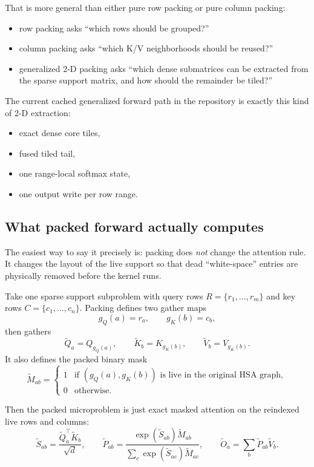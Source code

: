 \documentclass[11pt]{article}
\begin{document}
That is more general than either pure row packing or pure column packing:
\begin{itemize}[leftmargin=1.5em]
    \item row packing asks ``which rows should be grouped?''
    \item column packing asks ``which K/V neighborhoods should be reused?''
    \item generalized 2-D packing asks ``which dense submatrices can be
    extracted from the sparse support matrix, and how should the remainder be
    tiled?''
\end{itemize}

The current cached generalized forward path in the repository is exactly this
kind of 2-D extraction:
\begin{itemize}[leftmargin=1.5em]
    \item exact dense core tiles,
    \item fused tiled tail,
    \item one range-local softmax state,
    \item one output write per row range.
\end{itemize}

\subsection{What packed forward actually computes}

The easiest way to say it precisely is: packing does \emph{not} change the
attention rule. It changes the layout of the live support so that dead
``white-space'' entries are physically removed before the kernel runs.

Take one sparse support subproblem with query rows $R=\{r_1,\dots,r_m\}$ and
key rows $C=\{c_1,\dots,c_n\}$. Packing defines two gather maps
\[
g_Q(a)=r_a,\qquad g_K(b)=c_b,
\]
then gathers
\[
\widetilde Q_a = Q_{g_Q(a)},\qquad
\widetilde K_b = K_{g_K(b)},\qquad
\widetilde V_b = V_{g_K(b)}.
\]
It also defines the packed binary mask
\[
\widetilde M_{ab} =
\begin{cases}
1 & \text{if } (g_Q(a),g_K(b)) \text{ is live in the original HSA graph},\\
0 & \text{otherwise.}
\end{cases}
\]

Then the packed microproblem is just exact masked attention on the reindexed
live rows and columns:
\[
\widetilde S_{ab} = \frac{\widetilde Q_a^\top \widetilde K_b}{\sqrt d},
\qquad
\widetilde P_{ab}
=
\frac{\exp(\widetilde S_{ab})\widetilde M_{ab}}
{\sum_c \exp(\widetilde S_{ac})\widetilde M_{ac}},
\qquad
\widetilde O_a = \sum_b \widetilde P_{ab}\widetilde V_b.
\]
\end{document}
